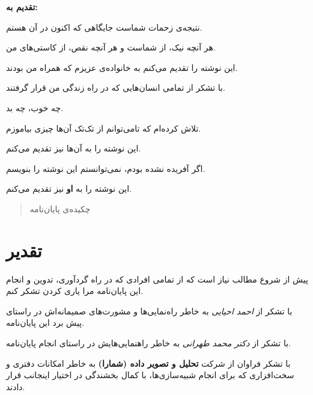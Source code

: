\documentclass[a4paper,11px]{article}
\begin{document}
{\Large
\textbf{
تقدیم به:
}

\vfill

نتیجه‌ی زحمات شماست جایگاهی که اکنون در آن هستم.

هر آنچه نیک، از شماست و هر آنچه نقص، از کاستی‌های من.

این نوشته را تقدیم می‌کنم به خانواده‌ی عزیزم که همراه من بودند.

\vfill

با تشکر از تمامی انسان‌هایی که در راه زندگی من قرار گرفتند.

چه خوب، چه بد.

تلاش کرده‌ام که تامی‌توانم از تک‌تک آن‌ها چیزی بیاموزم.

این نوشته را به آن‌ها نیز تقدیم می‌کنم.

\vfill


اگر آفریده نشده بودم، نمی‌توانستم این نوشته را بنویسم.

این نوشته را به 
\textbf{
او
} 
نیز تقدیم می‌کنم.


}

\vfill
\newpage


\begin{abstract}
چکیده‌ی پایان‌نامه
\end{abstract}
\newpage

\section*{
تقدیر
}

پیش از شروع مطالب نیاز است که از تمامی افرادی که در راه گردآوری، تدوین و انجام این پایان‌نامه مرا یاری کردن تشکر کنم.

\vspace{10mm}

با تشکر از 
\textit{
احمد احیایی
} 
به خاطر راه‌نمایی‌ها و مشورت‌های صمیمانه‌اش در راستای پیش برد این پایان‌نامه.

\vspace{10mm}

با تشکر از 
\textit{
دکتر محمد طهرانی
} 
به خاطر راهنمایی‌هایش در راستای انجام پایان‌نامه.

\vspace{10mm}

با تشکر فراوان از شرکت 
\textbf{
تحلیل و تصویر داده (شمارا)
} 
به خاطر امکانات دفتری و سخت‌افزاری که برای انجام شبیه‌سازی‌ها، با کمال بخشندگی در اختیار اینجانب قرار دادند.
\end{document}
